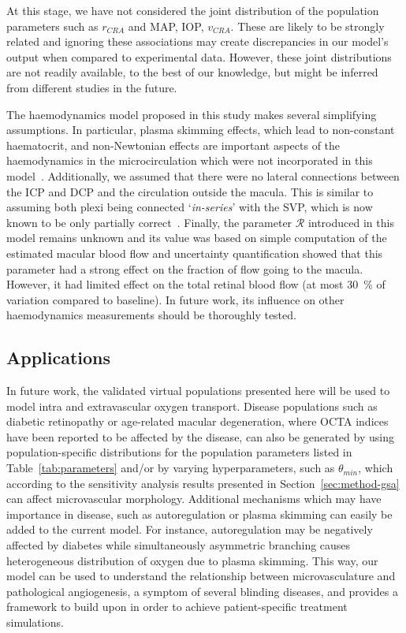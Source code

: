 \documentclass[11pt,]{article}
\begin{document}
At this stage, we have not considered the joint distribution of the population parameters such as $r_{CRA}$ and MAP, IOP, $v_{CRA}$.
These are likely to be strongly related and ignoring these associations may create discrepancies in our model's output when compared to experimental data.
However, these joint distributions are not readily available, to the best of our knowledge, but might be inferred from different studies in the future.

The haemodynamics model proposed in this study makes several simplifying assumptions.
In particular, plasma skimming effects, which lead to non-constant haematocrit, and non-Newtonian effects are important aspects of the haemodynamics in the microcirculation which were not incorporated in this model~\cite{Faahraeus1931,Secomb2013}.
Additionally, we assumed that there were no lateral connections between the ICP and DCP and the circulation outside the macula.
This is similar to assuming both plexi being connected `\textit{in-series}' with the SVP, which is now known to be only partially correct~\cite{An2020}.
Finally, the parameter $\mathcal R$ introduced in this model remains unknown and its value was based on simple computation of the estimated macular blood flow and uncertainty quantification showed that this parameter had a strong effect on the fraction of flow going to the macula.
However, it had limited effect on the total retinal blood flow (at most \SI{30}{\percent} of variation compared to baseline).
In future work, its influence on other haemodynamics measurements should be thoroughly tested.

\subsection{Applications}

In future work, the validated virtual populations presented here will be used to model intra and extravascular oxygen transport.
Disease populations such as diabetic retinopathy or age-related macular degeneration, where OCTA indices have been reported to be affected by the disease, can also be generated by using population-specific distributions for the population parameters listed in Table~\ref{tab:parameters} and/or by varying hyperparameters, such as $\theta_{min}$, which according to the sensitivity analysis results presented in Section~\ref{sec:method-gsa} can affect microvascular morphology.
Additional mechanisms which may have importance in disease, such as autoregulation\cite{Guidoboni2014,Arciero2013} or plasma skimming\cite{Ganesan_2010} can easily be added to the current model.
For instance, autoregulation may be negatively affected by diabetes\cite{Stitt_2016} while simultaneously asymmetric branching causes heterogeneous distribution of oxygen due to plasma skimming.
This way, our model can be used to understand the relationship between microvasculature and pathological angiogenesis, a symptom of several blinding diseases\cite{Medina_2016}, and provides a framework to build upon in order to achieve patient-specific treatment simulations.
\end{document}
